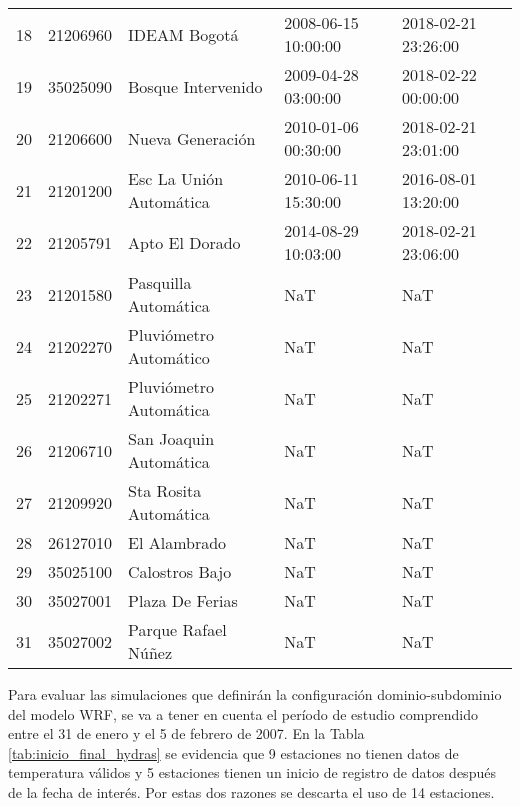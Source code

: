 \begin{table}[H]
\begin{tabular}{lrlll}
18 &  21206960 &             IDEAM Bogotá & 2008-06-15 10:00:00 & 2018-02-21 23:26:00 \\
19 &  35025090 &       Bosque Intervenido & 2009-04-28 03:00:00 & 2018-02-22 00:00:00 \\
20 &  21206600 &         Nueva Generación & 2010-01-06 00:30:00 & 2018-02-21 23:01:00 \\
21 &  21201200 &  Esc La Unión Automática & 2010-06-11 15:30:00 & 2016-08-01 13:20:00 \\
22 &  21205791 &           Apto El Dorado & 2014-08-29 10:03:00 & 2018-02-21 23:06:00 \\
23 &  21201580 &     Pasquilla Automática &                 NaT &                 NaT \\
24 &  21202270 &   Pluviómetro Automático &                 NaT &                 NaT \\
25 &  21202271 &       Pluviómetro Automática&                 NaT &                 NaT \\
26 &  21206710 &   San Joaquin Automática &                 NaT &                 NaT \\
27 &  21209920 &         Sta Rosita Automática &                 NaT &                 NaT \\
28 &  26127010 &             El Alambrado &                 NaT &                 NaT \\
29 &  35025100 &           Calostros Bajo &                 NaT &                 NaT \\
30 &  35027001 &          Plaza De Ferias &                 NaT &                 NaT \\
31 &  35027002 &      Parque Rafael Núñez &                 NaT &                 NaT \\

\bottomrule
\end{tabular}
\end{table}

Para evaluar las simulaciones que definirán la configuración dominio-subdominio del modelo WRF, se va a tener en cuenta el período de estudio comprendido entre el 31 de enero y el 5 de febrero de 2007. En la Tabla \ref{tab:inicio_final_hydras} se evidencia que 9 estaciones no tienen datos de temperatura válidos y 5 estaciones tienen un inicio de registro de datos después de la fecha de interés. Por estas dos razones se descarta el uso de 14 estaciones.\\


